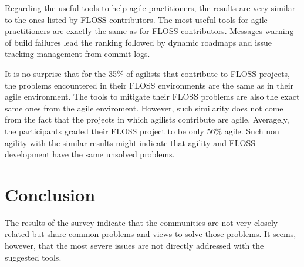 \documentclass[lnbip]{svmultln}
\begin{document}
Regarding the useful tools to help agile practitioners, the results
are very similar to the ones listed by FLOSS contributors. The most
useful tools for agile practitioners are exactly the same as for FLOSS
contributors. Messages warning of build failures lead the ranking
followed by dynamic roadmaps and issue tracking management from commit
logs.

It is no surprise that for the 35\% of agilists that contribute to
FLOSS projects, the problems encountered in their FLOSS environments
are the same as in their agile environment. The tools to mitigate
their FLOSS problems are also the exact same ones from the agile
enviroment. However, such similarity does not come from the fact that
the projects in which agilists contribute are agile. Averagely, the
participants graded their FLOSS project to be only 56\% agile. Such
non agility with the similar results might indicate that agility and
FLOSS development have the same unsolved problems.

\section{Conclusion}
\label{sec:conclusion}

The results of the survey indicate that the communities are not very
closely related but share common problems and views to solve those
problems. It seems, however, that the most severe issues are not
directly addressed with the suggested tools.


\end{document}
